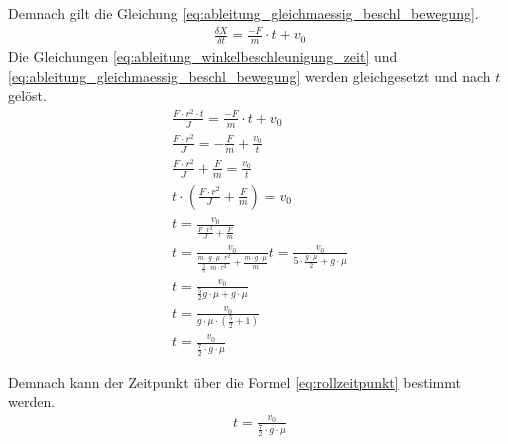 Demnach gilt die Gleichung \ref{eq:ableitung_gleichmaessig_beschl_bewegung}.
\begin{align}
    \frac{\delta X}{\delta t} = \frac{-F}{m} \cdot t + v_0\label{eq:ableitung_gleichmaessig_beschl_bewegung}
\end{align}
Die Gleichungen \ref{eq:ableitung_winkelbeschleunigung_zeit} und \ref{eq:ableitung_gleichmaessig_beschl_bewegung} werden gleichgesetzt und nach $t$ gelöst.
\begin{align}
    \frac{F \cdot r^2 \cdot t}{J} = \frac{-F}{m} \cdot t + v_0\\
    \frac{F \cdot r^2}{J} = -\frac{F}{m} + \frac{v_0}{t}\\
    \frac{F \cdot r^2}{J} + \frac{F}{m} = \frac{v_0}{t}\\
    t \cdot (\frac{F \cdot r^2}{J} + \frac{F}{m}) = v_0\\
    t = \frac{v_0}{\frac{F \cdot r^2}{J} + \frac{F}{m}}\\
    t = \frac{v_0}{\frac{m \cdot g \cdot \mu \cdot r^2}{\frac{2}{5} \cdot m \cdot r^2} + \frac{m \cdot g \cdot \mu}{m}}
    t = \frac{v_0}{5 \cdot \frac{g \cdot \mu}{2} + g \cdot \mu}\\
    t = \frac{v_0}{\frac{5}{2} g \cdot \mu + g \cdot \mu}\\
    t = \frac{v_0}{g \cdot \mu \cdot (\frac{5}{2} + 1)}\\
    t = \frac{v_0}{\frac{7}{2} \cdot g \cdot \mu}
\end{align}

Demnach kann der Zeitpunkt über die Formel \ref{eq:rollzeitpunkt} bestimmt werden.
\begin{align}
    t = \frac{v_0}{\frac{7}{2} \cdot g \cdot \mu}\label{eq:rollzeitpunkt}
\end{align}